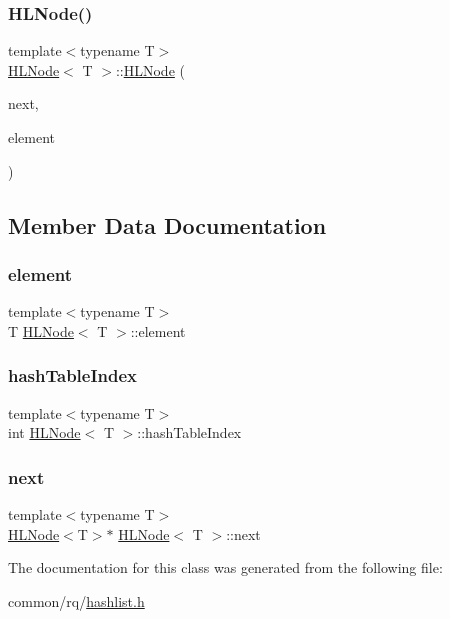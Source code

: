 \subsubsection{\texorpdfstring{H\+L\+Node()}{HLNode()}}
{\footnotesize\ttfamily template$<$typename T$>$ \\
\hyperlink{classHLNode}{H\+L\+Node}$<$ T $>$\+::\hyperlink{classHLNode}{H\+L\+Node} (\begin{DoxyParamCaption}\item[{\hyperlink{classHLNode}{H\+L\+Node}$<$ T $>$ $\ast$}]{next,  }\item[{T}]{element }\end{DoxyParamCaption})\hspace{0.3cm}{\ttfamily [inline]}}



\subsection{Member Data Documentation}
\mbox{\label{classHLNode_a17be2e766c987e797c71785bf1bad581}} 
\subsubsection{\texorpdfstring{element}{element}}
{\footnotesize\ttfamily template$<$typename T$>$ \\
T \hyperlink{classHLNode}{H\+L\+Node}$<$ T $>$\+::element}

\mbox{\label{classHLNode_a0ebbedf0c01596b658b69ae7e276ad1f}} 
\subsubsection{\texorpdfstring{hash\+Table\+Index}{hashTableIndex}}
{\footnotesize\ttfamily template$<$typename T$>$ \\
int \hyperlink{classHLNode}{H\+L\+Node}$<$ T $>$\+::hash\+Table\+Index}

\mbox{\label{classHLNode_a35c8458c7d7c91b21f9d926ddeb925df}} 
\subsubsection{\texorpdfstring{next}{next}}
{\footnotesize\ttfamily template$<$typename T$>$ \\
\hyperlink{classHLNode}{H\+L\+Node}$<$T$>$$\ast$ \hyperlink{classHLNode}{H\+L\+Node}$<$ T $>$\+::next}



The documentation for this class was generated from the following file\+:\begin{DoxyCompactItemize}
\item 
common/rq/\hyperlink{hashlist_8h}{hashlist.\+h}\end{DoxyCompactItemize}

